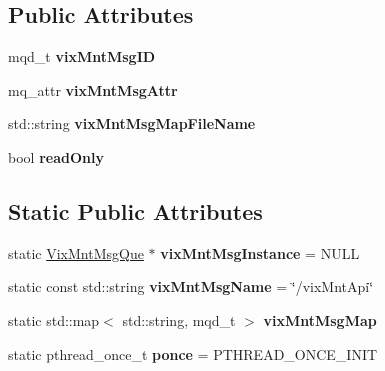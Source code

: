 \subsection*{Public Attributes}
\begin{DoxyCompactItemize}
\item 
\hypertarget{class_vix_mnt_msg_que_a18929125a51938ca956520067a09c032}{}\label{class_vix_mnt_msg_que_a18929125a51938ca956520067a09c032} 
mqd\+\_\+t {\bfseries vix\+Mnt\+Msg\+ID}
\item 
\hypertarget{class_vix_mnt_msg_que_a55585fa77dbedc5a5934349bcd7798a8}{}\label{class_vix_mnt_msg_que_a55585fa77dbedc5a5934349bcd7798a8} 
mq\+\_\+attr {\bfseries vix\+Mnt\+Msg\+Attr}
\item 
\hypertarget{class_vix_mnt_msg_que_a5c8fdf898e594a6d1cdcbcb4ede60b39}{}\label{class_vix_mnt_msg_que_a5c8fdf898e594a6d1cdcbcb4ede60b39} 
std\+::string {\bfseries vix\+Mnt\+Msg\+Map\+File\+Name}
\item 
\hypertarget{class_vix_mnt_msg_que_aceced283130a4c5cbee3e7fc6bb5c3ba}{}\label{class_vix_mnt_msg_que_aceced283130a4c5cbee3e7fc6bb5c3ba} 
bool {\bfseries read\+Only}
\end{DoxyCompactItemize}
\subsection*{Static Public Attributes}
\begin{DoxyCompactItemize}
\item 
\hypertarget{class_vix_mnt_msg_que_af3acc6cf6c34bc584f98bef1e99428e2}{}\label{class_vix_mnt_msg_que_af3acc6cf6c34bc584f98bef1e99428e2} 
static \hyperlink{class_vix_mnt_msg_que}{Vix\+Mnt\+Msg\+Que} $\ast$ {\bfseries vix\+Mnt\+Msg\+Instance} = N\+U\+LL
\item 
\hypertarget{class_vix_mnt_msg_que_ad401e5ed3644ce487b4ce289801d00db}{}\label{class_vix_mnt_msg_que_ad401e5ed3644ce487b4ce289801d00db} 
static const std\+::string {\bfseries vix\+Mnt\+Msg\+Name} = \char`\"{}/vix\+Mnt\+Api\char`\"{}
\item 
\hypertarget{class_vix_mnt_msg_que_a22f505c468facd89ccf7d57b6d81fe0b}{}\label{class_vix_mnt_msg_que_a22f505c468facd89ccf7d57b6d81fe0b} 
static std\+::map$<$ std\+::string, mqd\+\_\+t $>$ {\bfseries vix\+Mnt\+Msg\+Map}
\item 
\hypertarget{class_vix_mnt_msg_que_a27a1aa83afc39b4664ee7f68b4d87011}{}\label{class_vix_mnt_msg_que_a27a1aa83afc39b4664ee7f68b4d87011} 
static pthread\+\_\+once\+\_\+t {\bfseries ponce} = P\+T\+H\+R\+E\+A\+D\+\_\+\+O\+N\+C\+E\+\_\+\+I\+N\+IT
\end{DoxyCompactItemize}


